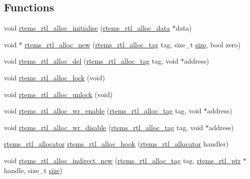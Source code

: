 \subsection*{Functions}
\begin{DoxyCompactItemize}
\item 
void \mbox{\hyperlink{rtl-allocator_8h_a2d9522999ddb398520073cf010f6effe}{rtems\+\_\+rtl\+\_\+alloc\+\_\+initialise}} (\mbox{\hyperlink{structrtems__rtl__alloc__data}{rtems\+\_\+rtl\+\_\+alloc\+\_\+data}} $\ast$data)
\item 
void $\ast$ \mbox{\hyperlink{rtl-allocator_8h_afddd36f9f551ae6646028bcc78f3a6dd}{rtems\+\_\+rtl\+\_\+alloc\+\_\+new}} (\mbox{\hyperlink{rtl-allocator_8h_a445a8615118b7fc14005ab20583153fd}{rtems\+\_\+rtl\+\_\+alloc\+\_\+tag}} tag, size\+\_\+t \mbox{\hyperlink{sun4u_2tte_8h_a245260f6f74972558f61b85227df5aae}{size}}, bool zero)
\item 
void \mbox{\hyperlink{rtl-allocator_8h_a53995705cd080120f3755af859d7cc50}{rtems\+\_\+rtl\+\_\+alloc\+\_\+del}} (\mbox{\hyperlink{rtl-allocator_8h_a445a8615118b7fc14005ab20583153fd}{rtems\+\_\+rtl\+\_\+alloc\+\_\+tag}} tag, void $\ast$address)
\item 
void \mbox{\hyperlink{rtl-allocator_8h_aca4dbc8b7c392bb60b9aa241f23773e5}{rtems\+\_\+rtl\+\_\+alloc\+\_\+lock}} (void)
\item 
void \mbox{\hyperlink{rtl-allocator_8h_a172d5d28306660657ae5cd4e1b39ecfc}{rtems\+\_\+rtl\+\_\+alloc\+\_\+unlock}} (void)
\item 
void \mbox{\hyperlink{rtl-allocator_8h_a4453db077482ecf6647ce38e2381c45c}{rtems\+\_\+rtl\+\_\+alloc\+\_\+wr\+\_\+enable}} (\mbox{\hyperlink{rtl-allocator_8h_a445a8615118b7fc14005ab20583153fd}{rtems\+\_\+rtl\+\_\+alloc\+\_\+tag}} tag, void $\ast$address)
\item 
void \mbox{\hyperlink{rtl-allocator_8h_a97d8fccb913b102e6d102cc86431ad64}{rtems\+\_\+rtl\+\_\+alloc\+\_\+wr\+\_\+disable}} (\mbox{\hyperlink{rtl-allocator_8h_a445a8615118b7fc14005ab20583153fd}{rtems\+\_\+rtl\+\_\+alloc\+\_\+tag}} tag, void $\ast$address)
\item 
\mbox{\hyperlink{rtl-allocator_8h_aa8af44a7337cfbfe72b669c82a604bb7}{rtems\+\_\+rtl\+\_\+allocator}} \mbox{\hyperlink{rtl-allocator_8h_a33521c77270f8bcfc8b5bfd61cd8ab0c}{rtems\+\_\+rtl\+\_\+alloc\+\_\+hook}} (\mbox{\hyperlink{rtl-allocator_8h_aa8af44a7337cfbfe72b669c82a604bb7}{rtems\+\_\+rtl\+\_\+allocator}} handler)
\item 
void \mbox{\hyperlink{rtl-allocator_8h_a0c6d91e7ac73cef0b5c4d91230766fb9}{rtems\+\_\+rtl\+\_\+alloc\+\_\+indirect\+\_\+new}} (\mbox{\hyperlink{rtl-allocator_8h_a445a8615118b7fc14005ab20583153fd}{rtems\+\_\+rtl\+\_\+alloc\+\_\+tag}} tag, \mbox{\hyperlink{structrtems__rtl__ptr}{rtems\+\_\+rtl\+\_\+ptr}} $\ast$handle, size\+\_\+t \mbox{\hyperlink{sun4u_2tte_8h_a245260f6f74972558f61b85227df5aae}{size}})

\end{DoxyCompactItemize}
